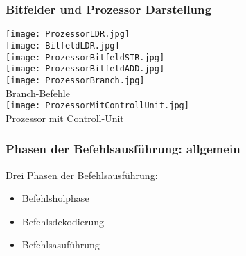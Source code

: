 		\subsubsection{Bitfelder und Prozessor Darstellung}
			\begin{center}
				\texttt{[image: ProzessorLDR.jpg]} \\
				\texttt{[image: BitfeldLDR.jpg]} \\
				\texttt{[image: ProzessorBitfeldSTR.jpg]} \\
				\texttt{[image: ProzessorBitfeldADD.jpg]} \\
				\texttt{[image: ProzessorBranch.jpg]} \\
				Branch-Befehle \\
				\texttt{[image: ProzessorMitControllUnit.jpg]} \\
				Prozessor mit Controll-Unit
			\end{center}
		
		
		\subsubsection{Phasen der Befehlsausführung: allgemein}
			Drei Phasen der Befehlsausführung:
			\begin{itemize}
				\item Befehlsholphase
				\item Befehlsdekodierung
				\item Befehlsasuführung
			\end{itemize}


